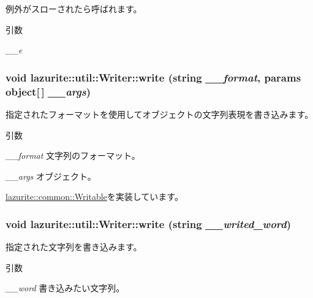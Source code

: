 例外がスローされたら呼ばれます。 
\begin{DoxyParams}{引数}
\item[{\em \_\-\_\-e}]\end{DoxyParams}
\hypertarget{classlazurite_1_1util_1_1_writer_ae7beb36247424b99646f4b557fcafa59}{
\subsubsection[{write}]{\setlength{\rightskip}{0pt plus 5cm}void lazurite::util::Writer::write (string {\em \_\-\_\-format}, \/  params object\mbox{[}$\,$\mbox{]} {\em \_\-\_\-args})}}
\label{classlazurite_1_1util_1_1_writer_ae7beb36247424b99646f4b557fcafa59}
指定されたフォーマットを使用してオブジェクトの文字列表現を書き込みます。 
\begin{DoxyParams}{引数}
\item[{\em \_\-\_\-format}]文字列のフォーマット。 \item[{\em \_\-\_\-args}]オブジェクト。 \end{DoxyParams}


\hyperlink{interfacelazurite_1_1common_1_1_writable_a3f0f9f537e8a8b3fa86bb13fea5ebef7}{lazurite::common::Writable}を実装しています。\hypertarget{classlazurite_1_1util_1_1_writer_af7b90159ade4db522568ba46b3c0a00a}{
\subsubsection[{write}]{\setlength{\rightskip}{0pt plus 5cm}void lazurite::util::Writer::write (string {\em \_\-\_\-writed\_\-word})}}
\label{classlazurite_1_1util_1_1_writer_af7b90159ade4db522568ba46b3c0a00a}
指定された文字列を書き込みます。 
\begin{DoxyParams}{引数}
\item[{\em \_\-\_\-word}]書き込みたい文字列。 \end{DoxyParams}


